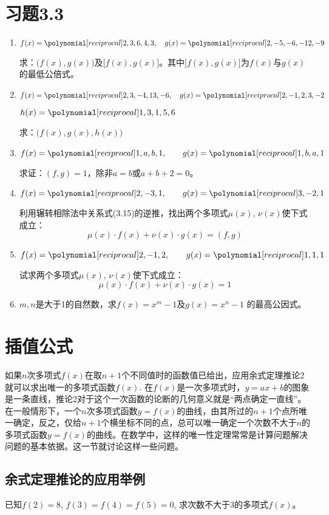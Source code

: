 \section*{习题3.3}

\begin{enumerate}
    \item $f(x)=\poly{2,3,6,4,3},\quad g(x)=\poly{2,-5,-6,-12,-9}$

求：$\bigl(f(x),g(x)\bigr)$及$\bigl[f(x),g(x)\bigr]$。其中$\bigl[f(x),g(x)\bigr]$为$f(x)$与$g(x)$的最低公倍式。

\item $f(x)=\poly{2,3,-4,13,-6},\quad g(x)=\poly{2,-1,2,3,-2}$

$h(x)=\poly{1,3,1,5,6}$

求：$\bigl(f(x),g(x),h(x)\bigr)$

\item $f(x)=\poly{1,a,b,1},\qquad g(x)=\poly{1,b,a,1}$

求证：$(f,g)=1$，除非$a=b$或$a+b+2=0$。
\item $f(x)=\poly{2,-3,1},\qquad g(x)=\poly{3,-2,1}$

利用辗转相除法中关系式(3.15)的逆推，找出两个多项式$\mu(x)$, $\nu(x)$使下式成立：
\[\mu(x)\cdot f(x)+\nu(x)\cdot g(x)=(f,g)\]

\item $f(x)=\poly{2,-1,2},\qquad g(x)=\poly{1,1,1}$

试求两个多项式$\mu(x)$, $\nu(x)$使下式成立：
\[\mu(x)\cdot f(x)+\nu(x)\cdot g(x)=1\]

\item $m,n$是大于1的自然数，求$f(x)=x^m-1$及$g(x)=x^n-1$
的最高公因式。
\end{enumerate}


\section{插值公式}
如果$n$次多项式$f(x)$在取$n+1$个不同值时的函数值已给出，应用余式定理推论2就可以求出唯一的多项式函数$f(x)$. 在$f(x)$是一次多项式时，$y=ax+b$的图象是一条直线，推论2对于这个一次函数的论断的几何意义就是“两点确定一直线”。在一般情形下，一个$n$次多项式函数$y=f(x)$的曲线，由其所过的$n+1$个点所唯一确定，反之，仅给$n+1$个横坐标不同的点，总可以唯一确定一个次数不大于$n$的多项式函数$y=f(x)$的曲线。在数学中，这样的唯一性定理常常是计算问题解决问题的基本依据。这一节就讨论这样一些问题。

\subsection{余式定理推论的应用举例}
\begin{example}
    已知$f(2)=8$, $f(3)=f(4)=f(5)=0$, 求次数不大于3的多项式$f(x)$。
\end{example}

